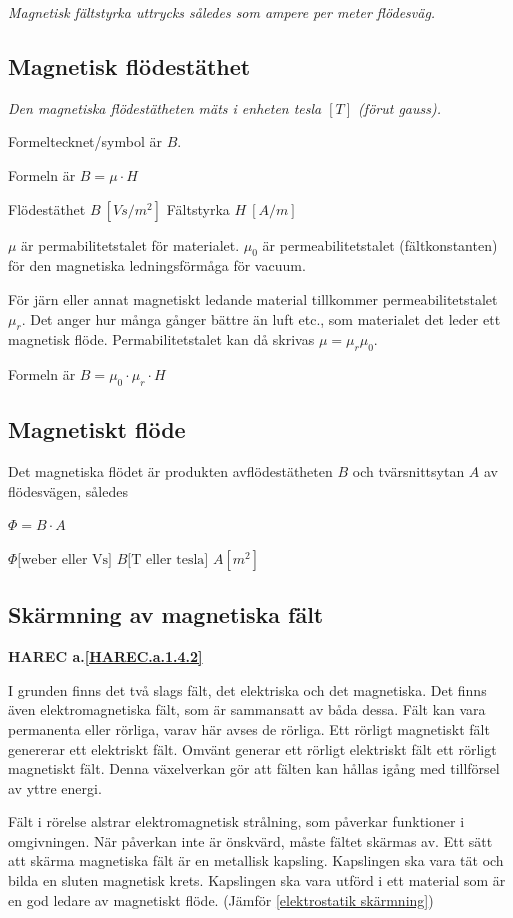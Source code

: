 \emph{Magnetisk fältstyrka uttrycks således som ampere per meter flödesväg.}

\subsection{Magnetisk flödestäthet}

\emph{Den magnetiska flödestätheten mäts i enheten tesla \([T]\) (förut gauss).}

Formeltecknet/symbol är \(B\).

Formeln är \(B = \mu \cdot H\)

Flödestäthet \(B\ [Vs/m^2]\) Fältstyrka \(H\ [A/m]\)

\(\mu\) är permabilitetstalet för materialet.
\(\mu_0\) är permeabilitetstalet (fältkonstanten) för den magnetiska
ledningsförmåga för vacuum.

För järn eller annat magnetiskt ledande material tillkommer permeabilitetstalet
\(\mu_r\).
Det anger hur många gånger bättre än luft etc., som materialet det leder ett
magnetisk flöde.
Permabilitetstalet kan då skrivas
\(\mu = \mu_r\mu_0\).

Formeln är \(B = \mu_0 \cdot \mu_r \cdot H\)

\subsection{Magnetiskt flöde}

Det magnetiska flödet är produkten avflödestätheten \(B\) och tvärsnittsytan
\(A\) av flödesvägen, således

\(\Phi = B \cdot A\)

\(\Phi \text{[weber eller Vs]}\) \(B \text{[T eller tesla]}\) \(A [m^2]\)

\subsection{Skärmning av magnetiska fält}
\textbf{HAREC a.\ref{HAREC.a.1.4.2}\label{myHAREC.a.1.4.2}}
\label{elektromagnetisk skärmning}

I grunden finns det två slags fält, det elektriska och det magnetiska. Det
finns även elektromagnetiska fält, som är sammansatt av båda dessa.
Fält kan vara permanenta eller rörliga, varav här avses de rörliga.
Ett rörligt magnetiskt fält genererar ett elektriskt fält.
Omvänt generar ett rörligt elektriskt fält ett rörligt magnetiskt fält.
Denna växelverkan gör att fälten kan hållas igång med tillförsel av yttre
energi.

Fält i rörelse alstrar elektromagnetisk strålning, som påverkar funktioner i
omgivningen.
När påverkan inte är önskvärd, måste fältet skärmas av.
Ett sätt att skärma magnetiska fält är en metallisk kapsling.
Kapslingen ska vara tät och bilda en sluten magnetisk krets.
Kapslingen ska vara utförd i ett material som är en god ledare av magnetiskt
flöde.
(Jämför \ref{elektrostatik skärmning})
